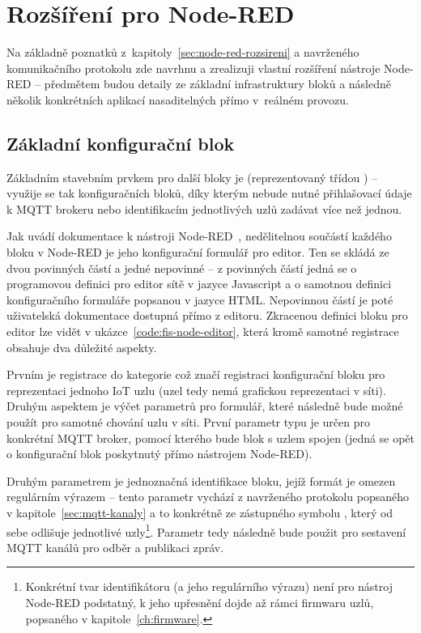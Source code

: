 \chapter{Rozšíření pro Node-RED}
\label{ch:rozsireni}

Na základně poznatků z~kapitoly~\ref{sec:node-red-rozsireni} a navrženého komunikačního protokolu zde navrhnu a
zrealizuji vlastní rozšíření nástroje Node-RED -- předmětem budou detaily ze základní infrastruktury bloků a
následně několik konkrétních
aplikací nasaditelných přímo v~reálném provozu.

\section{Základní konfigurační blok}\label{sec:zakladni-konfiguracni-blok}
Základním stavebním prvkem pro další bloky je  (reprezentovaný třídou ) -- využije se tak
konfiguračních bloků, díky kterým nebude nutné přihlašovací údaje k MQTT brokeru nebo identifikacím jednotlivých
uzlů zadávat více než jednou.

Jak uvádí dokumentace k nástroji Node-RED~\cite{NodeRedDocs}, nedělitelnou součástí každého bloku v Node-RED je jeho
konfigurační formulář pro editor.
Ten se skládá ze dvou povinných částí a jedné nepovinné -- z povinných částí jedná se o programovou definici pro editor
sítě v jazyce Javascript a o samotnou definici konfiguračního formuláře popsanou v jazyce HTML.
Nepovinnou částí je poté uživatelská dokumentace dostupná přímo z editoru.
Zkracenou definici bloku pro editor lze vidět v ukázce~\ref{code:fis-node-editor}, která kromě samotné registrace
obsahuje dva důležité aspekty.

Prvním je registrace do kategorie  což značí registraci konfigurační bloku pro reprezentaci jednoho IoT
uzlu (uzel tedy nemá grafickou reprezentaci v síti).
Druhým aspektem je výčet parametrů pro formulář, které následně bude možné použít pro samotné chování uzlu v síti.
První parametr typu  je určen pro konkrétní MQTT broker, pomocí kterého bude blok s uzlem spojen
(jedná se opět o konfigurační blok poskytnutý přímo nástrojem Node-RED).

Druhým parametrem je jednoznačná identifikace bloku, jejíž formát je omezen regulárním výrazem -- tento
parametr vychází z navrženého protokolu popsaného v kapitole~\ref{sec:mqtt-kanaly} a to
konkrétně ze zástupného symbolu , který od sebe odlišuje jednotlivé uzly\footnote{Konkrétní tvar
identifikátoru (a jeho regulárního výrazu) není pro nástroj Node-RED podstatný, k jeho upřesnění dojde až rámci
firmwaru uzlů, popsaného v kapitole~\ref{ch:firmware}.}.
Parametr  tedy následně bude použit pro sestavení MQTT kanálů pro odběr a publikaci zpráv.

